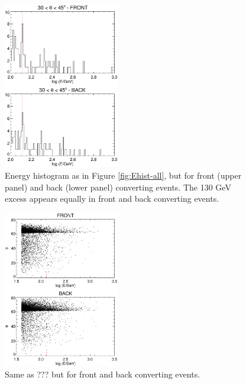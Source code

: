 \documentclass[aps,twocolumn,prd,superscriptaddress,showpacs,nofootinbib,fixfloat]{revtex4}
\begin{document}
\begin{figure}[p]
\centering
\includegraphics[width=0.45\textwidth]{plots/Ehist-frontback.ps}
\caption{Energy histogram as in Figure \ref{fig:Ehist-all}, but for front
  (upper panel) and back (lower panel) converting events.  The 130 GeV excess
  appears equally in front and back converting events. 
}
\label{fig:Ehist-frontback}
\end{figure}



\begin{figure}[p]
\centering
\includegraphics[width=0.45\textwidth]{plots/theta-E-frontback.ps}
\caption{Same as ??? but for front and back converting events.}
\label{fig:theta-E-frontback}
\end{figure}
\end{document}
